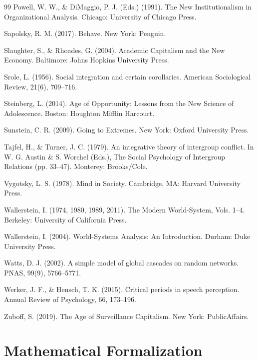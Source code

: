 \documentclass[12pt,a4paper]{article}
\begin{document}
\begin{thebibliography}{99}
 Powell, W. W., \& DiMaggio, P. J. (Eds.) (1991). The New Institutionalism in Organizational Analysis. Chicago: University of Chicago Press.

 Sapolsky, R. M. (2017). Behave. New York: Penguin.

 Slaughter, S., \& Rhoades, G. (2004). Academic Capitalism and the New Economy. Baltimore: Johns Hopkins University Press.

 Srole, L. (1956). Social integration and certain corollaries. American Sociological Review, 21(6), 709--716.

 Steinberg, L. (2014). Age of Opportunity: Lessons from the New Science of Adolescence. Boston: Houghton Mifflin Harcourt.

 Sunstein, C. R. (2009). Going to Extremes. New York: Oxford University Press.

 Tajfel, H., \& Turner, J. C. (1979). An integrative theory of intergroup conflict. In W. G. Austin \& S. Worchel (Eds.), The Social Psychology of Intergroup Relations (pp. 33--47). Monterey: Brooks/Cole.

 Vygotsky, L. S. (1978). Mind in Society. Cambridge, MA: Harvard University Press.

 Wallerstein, I. (1974, 1980, 1989, 2011). The Modern World-System, Vols. 1--4. Berkeley: University of California Press.

 Wallerstein, I. (2004). World-Systems Analysis: An Introduction. Durham: Duke University Press.

 Watts, D. J. (2002). A simple model of global cascades on random networks. PNAS, 99(9), 5766--5771.

 Werker, J. F., \& Hensch, T. K. (2015). Critical periods in speech perception. Annual Review of Psychology, 66, 173--196.

 Zuboff, S. (2019). The Age of Surveillance Capitalism. New York: PublicAffairs.

\end{thebibliography}

\appendix
\section{Mathematical Formalization}
\label{app:a}
\end{document}

